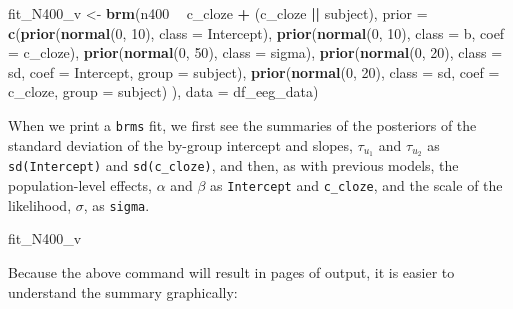 \documentclass[12pt,]{krantz}
\newenvironment{Shaded}{\begin{snugshade}}{\end{snugshade}}
\newcommand{\DataTypeTok}[1]{\textcolor[rgb]{0.13,0.29,0.53}{#1}}
\newcommand{\DecValTok}[1]{\textcolor[rgb]{0.00,0.00,0.81}{#1}}
\newcommand{\KeywordTok}[1]{\textcolor[rgb]{0.13,0.29,0.53}{\textbf{#1}}}
\newcommand{\NormalTok}[1]{#1}
\newcommand{\OperatorTok}[1]{\textcolor[rgb]{0.81,0.36,0.00}{\textbf{#1}}}
\newcommand{\StringTok}[1]{\textcolor[rgb]{0.31,0.60,0.02}{#1}}
\theoremstyle{definition}
\theoremstyle{definition}
\theoremstyle{definition}
\theoremstyle{remark}
\begin{document}
\begin{Shaded}
\begin{Highlighting}[]
\NormalTok{fit_N400_v <-}\StringTok{ }\KeywordTok{brm}\NormalTok{(n400 }\OperatorTok{~}\StringTok{ }\NormalTok{c_cloze }\OperatorTok{+}\StringTok{ }\NormalTok{(c_cloze }\OperatorTok{||}\StringTok{ }\NormalTok{subject),}
                  \DataTypeTok{prior =}
                      \KeywordTok{c}\NormalTok{(}\KeywordTok{prior}\NormalTok{(}\KeywordTok{normal}\NormalTok{(}\DecValTok{0}\NormalTok{, }\DecValTok{10}\NormalTok{), }\DataTypeTok{class =}\NormalTok{ Intercept),}
                        \KeywordTok{prior}\NormalTok{(}\KeywordTok{normal}\NormalTok{(}\DecValTok{0}\NormalTok{, }\DecValTok{10}\NormalTok{), }\DataTypeTok{class =}\NormalTok{ b, }\DataTypeTok{coef =}\NormalTok{ c_cloze),}
                        \KeywordTok{prior}\NormalTok{(}\KeywordTok{normal}\NormalTok{(}\DecValTok{0}\NormalTok{, }\DecValTok{50}\NormalTok{), }\DataTypeTok{class =}\NormalTok{ sigma),}
                        \KeywordTok{prior}\NormalTok{(}\KeywordTok{normal}\NormalTok{(}\DecValTok{0}\NormalTok{, }\DecValTok{20}\NormalTok{), }\DataTypeTok{class =}\NormalTok{ sd, }\DataTypeTok{coef =}\NormalTok{ Intercept, }\DataTypeTok{group =}\NormalTok{ subject),}
                        \KeywordTok{prior}\NormalTok{(}\KeywordTok{normal}\NormalTok{(}\DecValTok{0}\NormalTok{, }\DecValTok{20}\NormalTok{), }\DataTypeTok{class =}\NormalTok{ sd, }\DataTypeTok{coef =}\NormalTok{ c_cloze, }\DataTypeTok{group =}\NormalTok{ subject)}
\NormalTok{                        ),}
              \DataTypeTok{data =}\NormalTok{ df_eeg_data)}
\end{Highlighting}
\end{Shaded}

When we print a \texttt{brms} fit, we first see the summaries of the posteriors of the standard deviation of the by-group intercept and slopes, \(\tau_{u_1}\) and \(\tau_{u_2}\) as \texttt{sd(Intercept)} and \texttt{sd(c\_cloze)}, and then, as with previous models, the population-level effects, \(\alpha\) and \(\beta\) as \texttt{Intercept} and \texttt{c\_cloze}, and the scale of the likelihood, \(\sigma\), as \texttt{sigma}.

\begin{Shaded}
\begin{Highlighting}[]
\NormalTok{fit_N400_v}
\end{Highlighting}
\end{Shaded}

Because the above command will result in pages of output, it is easier to understand the summary graphically:
\end{document}
